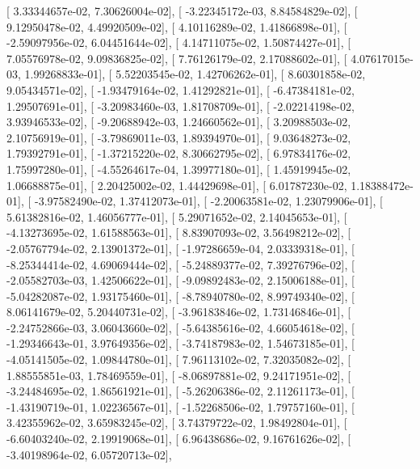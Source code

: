 \documentclass{article}
\begin{document}
       [  3.33344657e-02,   7.30626004e-02],
       [ -3.22345172e-03,   8.84584829e-02],
       [  9.12950478e-02,   4.49920509e-02],
       [  4.10116289e-02,   1.41866898e-01],
       [ -2.59097956e-02,   6.04451644e-02],
       [  4.14711075e-02,   1.50874427e-01],
       [  7.05576978e-02,   9.09836825e-02],
       [  7.76126179e-02,   2.17088602e-01],
       [  4.07617015e-03,   1.99268833e-01],
       [  5.52203545e-02,   1.42706262e-01],
       [  8.60301858e-02,   9.05434571e-02],
       [ -1.93479164e-02,   1.41292821e-01],
       [ -6.47384181e-02,   1.29507691e-01],
       [ -3.20983460e-03,   1.81708709e-01],
       [ -2.02214198e-02,   3.93946533e-02],
       [ -9.20688942e-03,   1.24660562e-01],
       [  3.20988503e-02,   2.10756919e-01],
       [ -3.79869011e-03,   1.89394970e-01],
       [  9.03648273e-02,   1.79392791e-01],
       [ -1.37215220e-02,   8.30662795e-02],
       [  6.97834176e-02,   1.75997280e-01],
       [ -4.55264617e-04,   1.39977180e-01],
       [  1.45919945e-02,   1.06688875e-01],
       [  2.20425002e-02,   1.44429698e-01],
       [  6.01787230e-02,   1.18388472e-01],
       [ -3.97582490e-02,   1.37412073e-01],
       [ -2.20063581e-02,   1.23079906e-01],
       [  5.61382816e-02,   1.46056777e-01],
       [  5.29071652e-02,   2.14045653e-01],
       [ -4.13273695e-02,   1.61588563e-01],
       [  8.83907093e-02,   3.56498212e-02],
       [ -2.05767794e-02,   2.13901372e-01],
       [ -1.97286659e-04,   2.03339318e-01],
       [ -8.25344414e-02,   4.69069444e-02],
       [ -5.24889377e-02,   7.39276796e-02],
       [ -2.05582703e-03,   1.42506622e-01],
       [ -9.09892483e-02,   2.15006188e-01],
       [ -5.04282087e-02,   1.93175460e-01],
       [ -8.78940780e-02,   8.99749340e-02],
       [  8.06141679e-02,   5.20440731e-02],
       [ -3.96183846e-02,   1.73146846e-01],
       [ -2.24752866e-03,   3.06043660e-02],
       [ -5.64385616e-02,   4.66054618e-02],
       [ -1.29346643e-01,   3.97649356e-02],
       [ -3.74187983e-02,   1.54673185e-01],
       [ -4.05141505e-02,   1.09844780e-01],
       [  7.96113102e-02,   7.32035082e-02],
       [  1.88555851e-03,   1.78469559e-01],
       [ -8.06897881e-02,   9.24171951e-02],
       [ -3.24484695e-02,   1.86561921e-01],
       [ -5.26206386e-02,   2.11261173e-01],
       [ -1.43190719e-01,   1.02236567e-01],
       [ -1.52268506e-02,   1.79757160e-01],
       [  3.42355962e-02,   3.65983245e-02],
       [  3.74379722e-02,   1.98492804e-01],
       [ -6.60403240e-02,   2.19919068e-01],
       [  6.96438686e-02,   9.16761626e-02],
       [ -3.40198964e-02,   6.05720713e-02],
\end{document}
